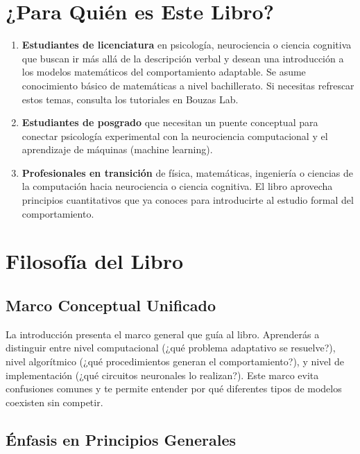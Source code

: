 \documentclass[
  letterpaper,
  DIV=11,
  numbers=noendperiod]{scrreprt}
\begin{document}
\section{¿Para Quién es Este Libro?}\label{para-quiuxe9n-es-este-libro}

\begin{enumerate}
\def\labelenumi{\arabic{enumi}.}
\item
  \textbf{Estudiantes de licenciatura} en psicología, neurociencia o
  ciencia cognitiva que buscan ir más allá de la descripción verbal y
  desean una introducción a los modelos matemáticos del comportamiento
  adaptable. Se asume conocimiento básico de matemáticas a nivel
  bachillerato. Si necesitas refrescar estos temas, consulta los
  tutoriales en Bouzas Lab.
\item
  \textbf{Estudiantes de posgrado} que necesitan un puente conceptual
  para conectar psicología experimental con la neurociencia
  computacional y el aprendizaje de máquinas (machine learning).
\item
  \textbf{Profesionales en transición} de física, matemáticas,
  ingeniería o ciencias de la computación hacia neurociencia o ciencia
  cognitiva. El libro aprovecha principios cuantitativos que ya conoces
  para introducirte al estudio formal del comportamiento.
\end{enumerate}

\section{Filosofía del Libro}\label{filosofuxeda-del-libro}

\subsection{Marco Conceptual
Unificado}\label{marco-conceptual-unificado}

La introducción presenta el marco general que guía al libro. Aprenderás
a distinguir entre nivel computacional (¿qué problema adaptativo se
resuelve?), nivel algorítmico (¿qué procedimientos generan el
comportamiento?), y nivel de implementación (¿qué circuitos neuronales
lo realizan?). Este marco evita confusiones comunes y te permite
entender por qué diferentes tipos de modelos coexisten sin competir.

\subsection{Énfasis en Principios
Generales}\label{uxe9nfasis-en-principios-generales}
\end{document}
